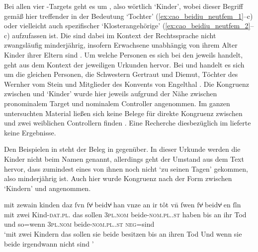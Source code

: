 Bei allen vier -Targets geht es um , also wörtlich
`Kinder', wobei dieser Begriff gemäß \citet[s.\,v.~]{lexer:mhdhwb}
hier treffender in der Bedeutung `Tochter'
(\ref{ex:cao_beidiu_neutfem_1}--c) oder vielleicht
auch spezifischer `Klosterangehörige'
(\ref{ex:cao_beidiu_neutfem_2}--c) aufzufassen ist.
Die  sind dabei im Kontext der Rechtssprache nicht zwangsläufig
minderjährig, insofern Erwachsene unabhängig von ihrem Alter Kinder ihrer
Eltern sind \autocites[vgl.][1736]{schwab2012}[siehe
auch][258--259]{birkenesfleischer2022}. Um welche Personen es sich bei den
 jeweils handelt, geht aus dem Kontext der jeweiligen Urkunden
hervor. Bei  und 
handelt es sich um die gleichen Personen, die Schwestern Gertraut und Diemut,
Töchter des Wernher vom Stein und Mitglieder des Konvents von Engelthal
\autocite[Kr.~Nürnberger Land; vgl.][619]{caor}.
%
Die Kongruenz zwischen  und  `Kinder' wurde hier
jeweils aufgrund der Nähe zwischen pronominalem Target und nominalem Controller
angenommen. Im ganzen unter\-suchten Material ließen sich keine Belege für
direkte Kongruenz zwischen  und zwei weiblichen Controllern finden%
. Eine Recherche diesbezüglich im
\REM{} lieferte keine Ergeb\-nisse.

Den Beispielen in  steht der Beleg in
 gegenüber. In dieser Urkunde werden die Kinder
nicht beim Namen genannt, allerdings geht der Umstand aus dem Text hervor, dass
zumindest eines von ihnen noch nicht  `zu seinen
Tagen' \autocites(Nr.~214)[218,18--19]{cao1}[vgl.][26]{caor} gekommen, also
minderjährig ist. Auch hier wurde Kongruenz nach der Form zwischen
 `Kindern' und  angenommen.

\begin{exe}
\ex \label{ex:cao_beidiu_neutunkn}
	\gll mit zewain kinden \textelp{} daz ſvn ſvͥ
		beidvͥ han vnze an ir tôt \textelp{} vn̄ ſwen
		ſvͥ beidvͥ {en ſîn}
		\textelp{} \\
		mit zwei Kind-\textsc{dat.pl.\NeutX} {} das sollen
		\textsc{3pl\subX.nom} beide-\textsc{nom.pl.\NeutX.st} haben bis an ihr
		Tod {} und so=wenn \textsc{3pl\subX.nom}
		beide-\textsc{nom.pl.\NeutX.st} \textsc{neg}=sind {} \\
	\trans `mit zwei Kindern \textelp{} das sollen sie beide besitzen
		bis an ihren Tod \textelp{} Und wenn sie beide irgendwann nicht
		 sind \textelp{}'
		\parencites(Nr.~214, Rottweil, 1274)[218.17--24]{cao1}
\end{exe}

